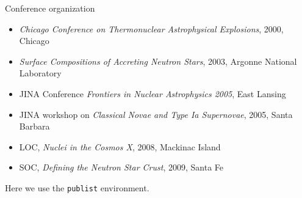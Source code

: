 \documentclass[11pt]{vitae}
\begin{document}
\begin{genericlist}
\item Conference organization
	\begin{itemize}
		\item[] \emph{Chicago Conference on Thermonuclear Astrophysical Explosions}, 2000, Chicago
		\item[] \emph{Surface Compositions of Accreting Neutron Stars}, 2003, Argonne National Laboratory
		\item[] JINA Conference \emph{Frontiers in Nuclear Astrophysics 2005}, East Lansing
		\item[] JINA workshop on \emph{Classical Novae and Type Ia Supernovae}, 2005, Santa Barbara
		\item[] LOC, \emph{Nuclei in the Cosmos X}, 2008, Mackinac Island
		\item[] SOC, \emph{Defining the Neutron Star Crust}, 2009, Santa Fe
	\end{itemize}
\end{genericlist}


\clearpage


Here we use the \verb+publist+ environment.
\end{document}
